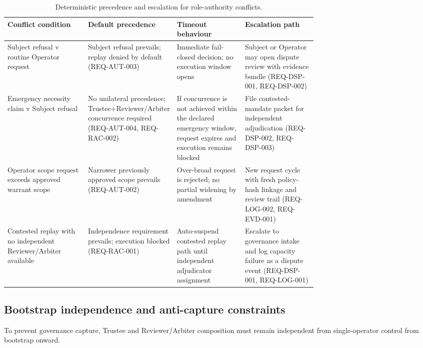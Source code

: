 \documentclass[11pt]{article}
\theoremstyle{definition}
\theoremstyle{plain}
\theoremstyle{remark}
\begin{document}
\begin{table}[H]
\centering
\small
\setlength{\tabcolsep}{6pt}
\renewcommand{\arraystretch}{1.20}
\begin{tabularx}{0.98\linewidth}{p{0.26\linewidth} p{0.24\linewidth} p{0.22\linewidth} Y}
\textbf{Conflict condition} & \textbf{Default precedence} & \textbf{Timeout behaviour} & \textbf{Escalation path} \\ \hline
{}
Subject refusal v routine Operator request & Subject refusal prevails; replay denied by default (REQ-AUT-003) & Immediate fail-closed decision; no execution window opens & Subject or Operator may open dispute review with evidence bundle (REQ-DSP-001, REQ-DSP-002) \\
Emergency necessity claim v Subject refusal & No unilateral precedence; Trustee+\allowbreak Reviewer/\allowbreak Arbiter concurrence required (REQ-AUT-004, REQ-RAC-002) & If concurrence is not achieved within the declared emergency window, request expires and execution remains blocked & File contested-mandate packet for independent adjudication (REQ-DSP-002, REQ-DSP-003) \\
Operator scope request exceeds approved warrant scope & Narrower previously approved scope prevails (REQ-AUT-002) & Over-broad request is rejected; no partial widening by amendment & New request cycle with fresh policy-hash linkage and review trail (REQ-LOG-002, REQ-EVD-001) \\
Contested replay with no independent Reviewer/Arbiter available & Independence requirement prevails; execution blocked (REQ-RAC-001) & Auto-suspend contested replay path until independent adjudicator assignment & Escalate to governance intake and log capacity failure as a dispute event (REQ-DSP-001, REQ-LOG-001) \\
\end{tabularx}
\caption{Deterministic precedence and escalation for role-authority conflicts.}
\label{tbl:authority-precedence}
\end{table}

\subsection{Bootstrap independence and anti-capture constraints}
To prevent governance capture, Trustee and Reviewer/Arbiter composition must remain independent from
single-operator control from bootstrap onward.
\end{document}
